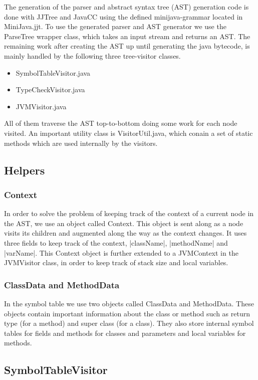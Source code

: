 \documentclass[paper=a4, fontsize=11pt]{scrartcl} %
\numberwithin{equation}{section} %
\numberwithin{figure}{section} %
\numberwithin{table}{section} %
\begin{document}
The generation of the parser and abstract syntax tree (AST) generation code is done with JJTree and JavaCC using the defined minijava-grammar located in MiniJava.jjt.
To use the generated parser and AST generator we use the ParseTree wrapper class, which takes an input stream and returns an AST.
The remaining work after creating the AST up until generating the java bytecode, is mainly handled by the following three tree-visitor classes.
\begin{itemize}
  \item{SymbolTableVisitor.java}
  \item{TypeCheckVisitor.java}
  \item{JVMVisitor.java}
\end{itemize}
All of them traverse the AST top-to-bottom doing some work for each node visited.
An important utility class is VisitorUtil.java, which conain a set of static methods which are used internally by the visitors.

\subsection{Helpers}

\subsubsection*{Context}

In order to solve the problem of keeping track of the context of a current node in the AST, we use an object called Context.
This object is sent along as a node visits its children and augmented along the way as the context changes.
It uses three fields to keep track of the context, |className|, |methodName| and |varName|.
This Context object is further extended to a JVMContext in the JVMVisitor class, in order to keep track of stack size and local variables.

\subsubsection*{ClassData and MethodData}

In the symbol table we use two objects called ClassData and MethodData.
These objects contain important information about the class or method such as return type (for a method) and super class (for a class).
They also store internal symbol tables for fields and methods for classes and parameters and local variables for methods.

\subsection{SymbolTableVisitor}
\end{document}
